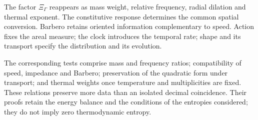 The factor $\Xi_\Gamma$ reappears as mass weight, relative frequency,
radial dilation and thermal exponent. The constitutive response determines
the common spatial conversion. Barbero retains oriented information
complementary to speed. Action fixes the areal measure; the clock
introduces the temporal rate; shape and its transport specify the
distribution and its evolution.

The corresponding tests comprise mass and frequency ratios; compatibility
of speed, impedance and Barbero; preservation of the quadratic form under
transport; and thermal weights once temperature and multiplicities are
fixed. These relations preserve more data than an isolated decimal
coincidence. Their proofs retain the energy balance and the conditions
of the entropies considered; they do not imply zero thermodynamic entropy.
